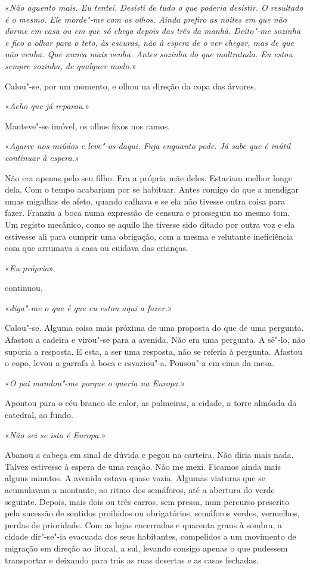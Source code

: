 «\emph{Não aguento mais. Eu tentei. Desisti de tudo o que poderia
desistir. O resultado é o mesmo. Ele morde"-me com os olhos. Ainda
prefiro as noites em que não dorme em casa ou em que só chega depois das
três da manhã. Deito"-me sozinha e fico a olhar para o teto, às
escuras, não à espera de o ver chegar, mas de que não venha. Que nunca
mais venha. Antes sozinha do que maltratada. Eu estou sempre sozinha, de
qualquer modo.}»

Calou"-se, por um momento, e olhou na direção da copa das árvores.

«\emph{Acho que já reparou.}»

Manteve"-se imóvel, os olhos fixos nos ramos.

«\emph{Agarre nos miúdos e leve"-os daqui. Fuja enquanto pode. Já sabe
que é inútil continuar à espera.}»

Não era apenas pelo seu filho. Era a própria mãe deles. Estariam melhor
longe dela. Com o tempo acabariam por se habituar. Antes comigo do que a
mendigar umas migalhas de afeto, quando calhava e se ela não tivesse
outra coisa para fazer. Franziu a boca numa expressão de censura e
prosseguiu no mesmo tom. Um registo mecânico, como se aquilo lhe tivesse
sido ditado por outra voz e ela estivesse ali para cumprir uma
obrigação, com a mesma e relutante ineficiência com que arrumava a casa
ou cuidava das crianças.

«\emph{Eu própria}»,

continuou,

«\emph{diga"-me o que é que eu estou aqui a fazer.}»

Calou"-se. Alguma coisa mais próxima de uma proposta do que de uma
pergunta. Afastou a cadeira e virou"-se para a avenida. Não era uma
pergunta. A sê"-lo, não suporia a resposta. E esta, a ser uma resposta,
não se referia à pergunta. Afastou o copo, levou a garrafa à boca e
esvaziou"-a. Pousou"-a em cima da mesa.

«\emph{O pai mandou"-me porque o queria na Europa.}»

Apontou para o céu branco de calor, as palmeiras, a cidade, a torre
almóada da catedral, ao fundo.

«\emph{Não sei se isto é Europa.}»

Abanou a cabeça em sinal de dúvida e pegou na carteira. Não diria mais
nada. Talvez estivesse à espera de uma reação. Não me mexi. Ficamos
ainda mais alguns minutos. A avenida estava quase vazia. Algumas
viaturas que se acumulavam a montante, ao ritmo dos semáforos, até a
abertura do verde seguinte. Depois, mais dois ou três carros, sem
pressa, num percurso prescrito pela sucessão de sentidos proibidos ou
obrigatórios, semáforos verdes, vermelhos, perdas de prioridade. Com as
lojas encerradas e quarenta graus à sombra, a cidade dir"-se"-ia
evacuada dos seus habitantes, compelidos a um movimento de migração em
direção ao litoral, a sul, levando consigo apenas o que pudessem
transportar e deixando para trás as ruas desertas e as casas fechadas.

